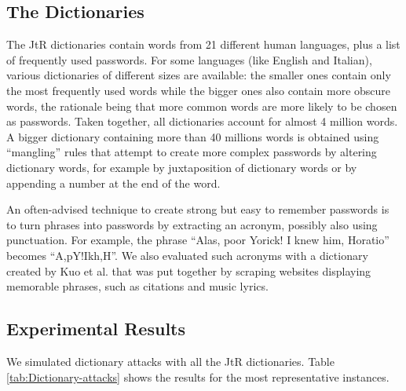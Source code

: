 \documentclass[a4paper,twocolumn]{article}
\begin{document}
\subsection{The Dictionaries}

The JtR dictionaries contain words from 21 different human languages,
plus a list of frequently used passwords. For some languages (like
English and Italian), various dictionaries of different sizes are
available: the smaller ones contain only the most frequently used
words while the bigger ones also contain more obscure words, the rationale
being that more common words are more likely to be chosen as passwords.
Taken together, all dictionaries account for almost 4 million words.
A bigger dictionary containing more than 40 millions words is obtained
using {}``mangling'' rules that attempt to create more complex passwords
by altering dictionary words, for example by juxtaposition of dictionary
words or by appending a number at the end of the word.

An often-advised technique to create strong but easy to remember passwords
is to turn phrases into passwords by extracting an acronym, possibly
also using punctuation. For example, the phrase {}``Alas, poor Yorick!
I knew him, Horatio'' becomes {}``A,pY!Ikh,H''. We also evaluated
such acronyms with a dictionary created by Kuo et al. \cite{Kuo2006Human}
that was put together by scraping websites displaying memorable phrases,
such as citations and music lyrics.


\subsection{Experimental Results}

We simulated dictionary attacks with all the JtR dictionaries. Table
\ref{tab:Dictionary-attacks} shows the results for the most representative
instances.
\end{document}
